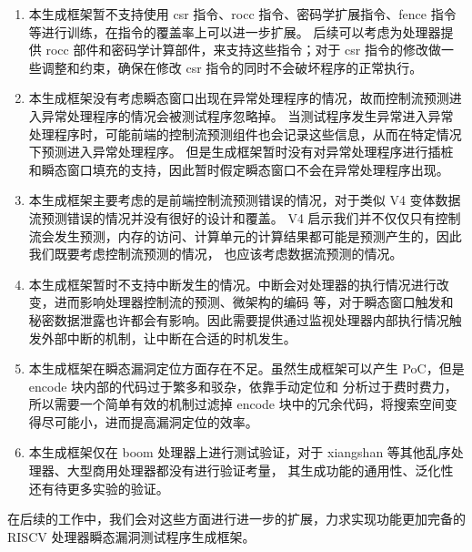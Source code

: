 \begin{enumerate}
    \item 本生成框架暂不支持使用 csr 指令、rocc 指令、密码学扩展指令、fence 指令等进行训练，在指令的覆盖率上可以进一步扩展。
后续可以考虑为处理器提供 rocc 部件和密码学计算部件，来支持这些指令；对于 csr 指令的修改做一些调整和约束，确保在修改 csr
指令的同时不会破坏程序的正常执行。\par
    \item 本生成框架没有考虑瞬态窗口出现在异常处理程序的情况，故而控制流预测进入异常处理程序的情况会被测试程序忽略掉。
当测试程序发生异常进入异常处理程序时，可能前端的控制流预测组件也会记录这些信息，从而在特定情况下预测进入异常处理程序。
但是生成框架暂时没有对异常处理程序进行插桩和瞬态窗口填充的支持，因此暂时假定瞬态窗口不会在异常处理程序出现。\par
    \item 本生成框架主要考虑的是前端控制流预测错误的情况，对于类似 V4 变体数据流预测错误的情况并没有很好的设计和覆盖。
V4 启示我们并不仅仅只有控制流会发生预测，内存的访问、计算单元的计算结果都可能是预测产生的，因此我们既要考虑控制流预测的情况，
也应该考虑数据流预测的情况。\par
    \item 本生成框架暂时不支持中断发生的情况。中断会对处理器的执行情况进行改变，进而影响处理器控制流的预测、微架构的编码
等，对于瞬态窗口触发和秘密数据泄露也许都会有影响。因此需要提供通过监视处理器内部执行情况触发外部中断的机制，让中断在合适的时机发生。\par
    \item 本生成框架在瞬态漏洞定位方面存在不足。虽然生成框架可以产生 PoC，但是 encode 块内部的代码过于繁多和驳杂，依靠手动定位和
分析过于费时费力，所以需要一个简单有效的机制过滤掉 encode 块中的冗余代码，将搜索空间变得尽可能小，进而提高漏洞定位的效率。\par
    \item 本生成框架仅在 boom 处理器上进行测试验证，对于 xiangshan 等其他乱序处理器、大型商用处理器都没有进行验证考量，
其生成功能的通用性、泛化性还有待更多实验的验证。\par
\end{enumerate}

在后续的工作中，我们会对这些方面进行进一步的扩展，力求实现功能更加完备的 RISCV 处理器瞬态漏洞测试程序生成框架。\par


